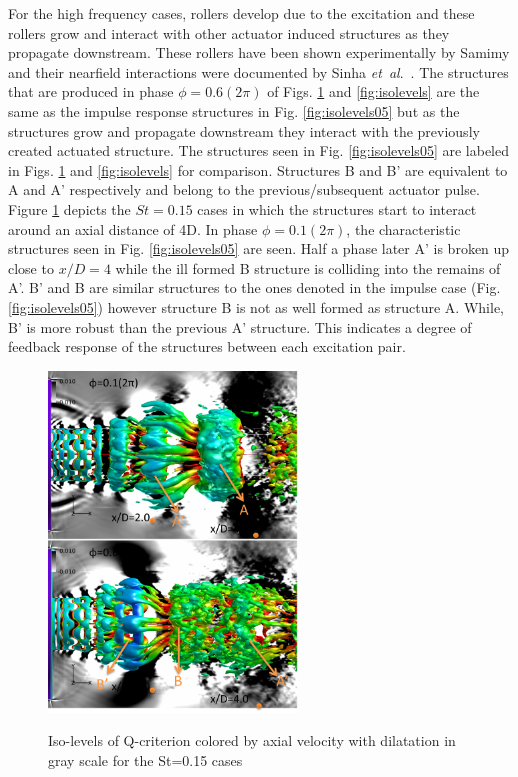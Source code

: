 \documentclass[english]{aiaa-tc}
\newcommand*{\etal}{\textit{et~al}.\ }
\begin{document}
For the high frequency cases, rollers develop due to the excitation and these rollers grow and interact with other actuator induced structures as they propagate downstream. These rollers have been shown experimentally by Samimy \cite{sm2007} and their nearfield interactions were documented by Sinha \etal \cite{sinha2013}. The structures that are produced in phase $\phi=0.6(2\pi)$ of Figs. \ref{fig:isolevels15} and \ref{fig:isolevels} are the same as the impulse response structures in Fig. \ref{fig:isolevels05} but as the structures grow and propagate downstream they interact with the previously created actuated structure. The structures seen in Fig. \ref{fig:isolevels05} are labeled in Figs. \ref{fig:isolevels15} and \ref{fig:isolevels} for comparison. Structures B and B' are equivalent to A and A' respectively and belong to the previous/subsequent actuator pulse.
Figure \ref{fig:isolevels15} depicts the $St=0.15$ cases in which the structures start to interact around an axial distance of 4D. In phase $\phi=0.1(2\pi)$, the characteristic structures seen in Fig. \ref{fig:isolevels05} are seen. Half a phase later A' is broken up close to $x/D=4$ while the ill formed B structure is colliding into the remains of A'. B' and B are similar structures to the ones denoted in the impulse case (Fig. \ref{fig:isolevels05}) however structure B is not as well formed as structure A. While, B' is more robust than the previous A' structure. This indicates a degree of feedback response of the structures between each excitation pair. %
\begin{figure}
\begin{center}
\begin{centering}
{\includegraphics[width=2.6in]{M09St015qcritphase0106AB}}
\end{centering}
\caption{Iso-levels of Q-criterion colored by axial velocity with dilatation in gray scale for the St=0.15 cases}
\label{fig:isolevels15}
\end{center}
\end{figure}
\end{document}
